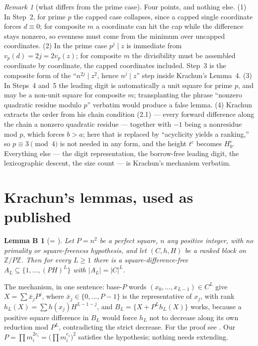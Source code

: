 \documentclass[11pt]{amsart}
\theoremstyle{plain}
\newtheorem*{lemB}{Lemma B}
\theoremstyle{remark}
\newtheorem{remark}{Remark}
\newcommand{\Z}{\mathbb{Z}}
\begin{document}
\begin{remark}[what differs from the prime case]\label{rem:prime}
Four points, and nothing else.
(1) In Step~2, for prime $p$ the capped case collapses, since a capped
single coordinate forces $d \equiv 0$; for composite $m$ a coordinate can
hit the cap while the difference stays nonzero, so evenness must come from
the minimum over uncapped coordinates.
(2) In the prime case $p^j \mid z$ is immediate from
$v_p(d) = 2j = 2 v_p(z)$; for composite $m$ the divisibility must be
assembled coordinate by coordinate, the capped coordinates included. Step~3
is the composite form of the ``$n^{2j} \mid z^2$, hence $n^j \mid z$'' step
inside Krachun's Lemma~4.
(3) In Steps~4 and~5 the leading digit is automatically a unit square for
prime $p$, and may be a non-unit square for composite $m$; transplanting the
phrase ``nonzero quadratic residue modulo $p$'' verbatim would produce a
false lemma.
(4) Krachun extracts the order from his chain condition (2.1) --- every
forward difference along the chain a nonzero quadratic residue --- together
with $-1$ being a nonresidue mod $p$, which forces $b > a$; here that is
replaced by ``acyclicity yields a ranking,'' so $p \equiv 3 \pmod 4$ is not
needed in any form, and the height $t^e$ becomes $H_0^e$.
Everything else --- the digit representation, the borrow-free leading digit,
the lexicographic descent, the size count --- is Krachun's mechanism
verbatim.
\end{remark}

\section{Krachun's lemmas, used as published}\label{sec:krachun}

\begin{lemB}[{= \cite[Lemma~4]{Krachun}}]
Let $P = n^2$ be a perfect square, $n$ any positive integer, with no
primality or square-freeness hypothesis, and let $(C, h, H)$ be a ranked
block on $\Z/P\Z$. Then for every $L \ge 1$ there is a
square-difference-free $A_L \subseteq \{1,\dots,(PH)^L\}$ with
$|A_L| = |C|^L$.
\end{lemB}

The mechanism, in one sentence: base-$P$ words
$(x_0,\dots,x_{L-1}) \in C^L$ give $X = \sum \bar{x}_j P^j$, where
$\bar{x}_j \in \{0,\dots,P-1\}$ is the representative of $x_j$, with rank
$h_L(X) = \sum h(x_j) H^{L-1-j}$, and $B_L = \{X + P^L h_L(X)\}$ works,
because a positive square difference in $B_L$ would force $h_L$ not to
decrease along its own reduction mod $P^L$, contradicting the strict
decrease. For the proof see \cite[Lemma~4]{Krachun}. Our
$P = \prod m_i^{2e_i} = \bigl(\prod m_i^{e_i}\bigr)^2$ satisfies the
hypothesis; nothing needs extending.
\end{document}
